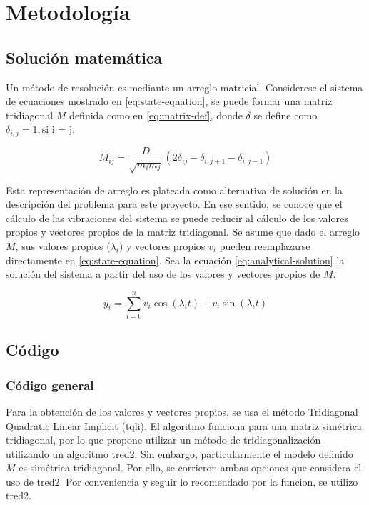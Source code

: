 \section{Metodología}
\subsection{Solución matemática}

Un método de resolución es mediante un arreglo matricial. Considerese el sistema de ecuaciones mostrado en \ref{eq:state-equation}, se puede formar una matriz tridiagonal $M$ definida como en \ref{eq:matrix-def}, donde $\delta$ se define como $\delta_{i,j} = 1, \text{si i = j}$.

\begin{equation}
	M_{ij} = \frac{D}{\sqrt{m_i m_j}} (2 \delta_{ij} - \delta_{i, j+1} - \delta_{i, j-1}) 
	\label{eq:matrix-def}
\end{equation}

Esta representación de arreglo es plateada como alternativa de solución en la descripción del problema para este proyecto. En ese sentido, se conoce que el cálculo de las vibraciones del sistema se puede reducir al cálculo de los valores propios y vectores propios de la matriz tridiagonal. Se asume que dado el arreglo $M$, sus valores propios ($\lambda_i)$ y vectores propios $v_i$ pueden reemplazarse directamente en \ref{eq:state-equation}. Sea la ecuación \ref{eq:analytical-solution} la solución del sistema a partir del uso de los valores y vectores propios de $M$. 

\begin{equation}
	y_{i} = \sum^{n}_{i=0} v_i \cos(\lambda_i t ) + v_i \sin(\lambda_i t )  
	\label{eq:analytical-solution}
\end{equation}

\subsection{Código}
\subsubsection{Código general}

Para la obtención de los valores y vectores propios, se usa el método Tridiagonal Quadratic Linear Implicit (tqli). El algoritmo funciona para una matriz simétrica tridiagonal, por lo que propone utilizar un método de tridiagonalización utilizando un algoritmo tred2. Sin embargo, particularmente el modelo definido $M$ es simétrica tridiagonal. Por ello, se corrieron ambas opciones que considera el uso de tred2. Por conveniencia y seguir lo recomendado por la funcion, se utilizo tred2.

